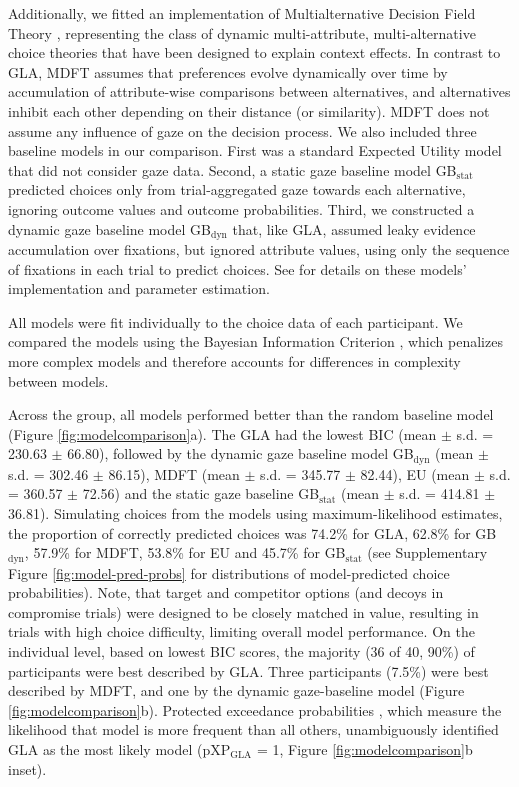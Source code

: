 \documentclass[11pt, a4paper]{article}
\begin{document}
Additionally, we fitted an implementation of Multialternative Decision Field Theory \parencite[MDFT;][]{roe2001MultialternativeDecisionField}, representing the class of dynamic multi-attribute, multi-alternative choice theories that have been designed to explain context effects. In contrast to GLA, MDFT assumes that preferences evolve dynamically over time by accumulation of attribute-wise comparisons between alternatives, and alternatives inhibit each other depending on their distance (or similarity). MDFT does not assume any influence of gaze on the decision process. We also included three baseline models in our comparison. First was a standard Expected Utility model \parencite[EU;][]{vonneumann1947TheoryGamesEconomic} that did not consider gaze data. Second, a static gaze baseline model GB$_{\text{stat}}$ predicted choices only from trial-aggregated gaze towards each alternative, ignoring outcome values and outcome probabilities. Third, we constructed a dynamic gaze baseline model GB$_{\text{dyn}}$ that, like GLA, assumed leaky evidence accumulation over fixations, but ignored attribute values, using only the sequence of fixations in each trial to predict choices. See  for details on these models' implementation and parameter estimation.

All models were fit individually to the choice data of each participant. We compared the models using the Bayesian Information Criterion \parencite[BIC;][]{schwarz1978EstimatingDimensionModel}, which penalizes more complex models and therefore accounts for differences in complexity between models.

Across the group, all models performed better than the random baseline model (Figure \ref{fig:modelcomparison}a). The GLA had the lowest BIC (mean $\pm$ s.d. = 230.63 $\pm$ 66.80), followed by the dynamic gaze baseline model GB$_{\text{dyn}}$ (mean $\pm$ s.d. = 302.46 $\pm$ 86.15), MDFT (mean $\pm$ s.d. = 345.77 $\pm$ 82.44), EU (mean $\pm$ s.d. = 360.57 $\pm$ 72.56) and the static gaze baseline GB$_{\text{stat}}$ (mean $\pm$ s.d. = 414.81 $\pm$ 36.81). Simulating choices from the models using maximum-likelihood estimates, the proportion of correctly predicted choices was 74.2\% for GLA, 62.8\% for GB$_{\text{dyn}}$, 57.9\% for MDFT, 53.8\% for EU and 45.7\% for GB$_{\text{stat}}$ (see Supplementary Figure \ref{fig:model-pred-probs} for distributions of model-predicted choice probabilities). Note, that target and competitor options (and decoys in compromise trials) were designed to be closely matched in value, resulting in trials with high choice difficulty, limiting overall model performance. On the individual level, based on lowest BIC scores, the majority (36 of 40, 90\%) of participants were best described by GLA. Three participants (7.5\%) were best described by MDFT, and one by the dynamic gaze-baseline model (Figure \ref{fig:modelcomparison}b). Protected exceedance probabilities \parencite{rigoux2014BayesianModelSelection}, which measure the likelihood that model is more frequent than all others, unambiguously identified GLA as the most likely model (pXP$_{\text{GLA}}$ = 1, Figure \ref{fig:modelcomparison}b inset).
\end{document}
